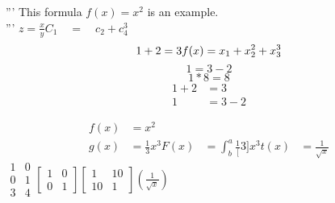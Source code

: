 \documentclass{article}
\begin{document}
  \section{}
  '''
  This formula $f(x) = x^2$ is an example.\\
  '''
  $z = \frac{x}{y}$\quad $C_1 \quad = \quad c_2 + c_4^3$\\
  \begin{equation*}
      1 + 2 = 3\\
      f(x) = x_1 + x_2^2 + x_3^3
  \end{equation*}
  \begin{equation*}
      1 = 3 - 2
  \end{equation*}
  \begin{equation*}
      1 * 8 = 8
  \end{equation*}
  \begin{align*}
      1 + 2 &= 3\\
      1 &= 3-2
  \end{align*}

  \begin{align*}
      f(x) &= x^2\\
      g(x) &= \frac{1}{3}x^3
      F(x) &= \int^a_b \frac{1}[3]x^3
      t(x) &= \frac{1}{\sqrt{x}}
  \end{align*}
  $\begin{matrix}
      1 & 0\\
      0 & 1\\
      3 & 4
  \end{matrix}
  [
      \begin{matrix}
          1 & 0\\
          0 & 1
      \end{matrix}
  ]
  \left[
      \begin{matrix}
          1 & 10\\
          10 & 1
      \end{matrix}
  \right]
  \left(\frac{1}{\sqrt{x}}\right)
$
\end{document}
